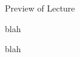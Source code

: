 \begin{frame}{Preview of Lecture \nextlecture}

\begin{itemize}
{\small
\item blah
\item blah
}
\end{itemize}

\end{frame}

